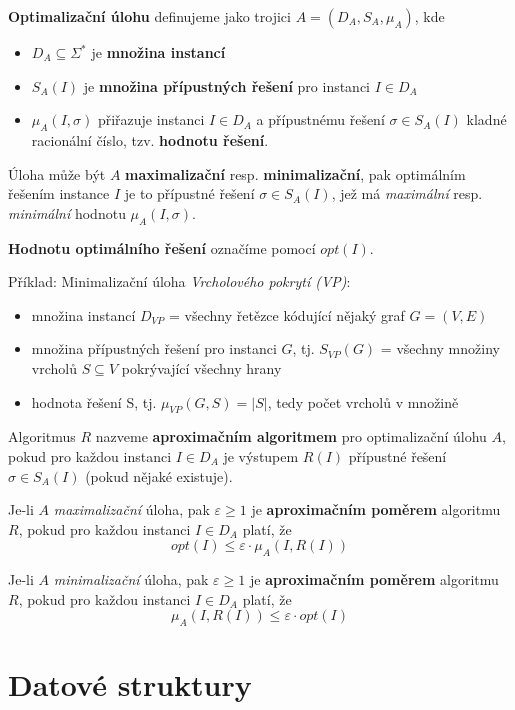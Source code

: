 \documentclass[11pt]{report} %
\begin{document}
\textbf{Optimalizační úlohu} definujeme jako trojici $A = (D_A, S_A, \mu_A)$, kde
\begin{itemize}
	\leftskip 20pt
	\setlength{\itemsep}{0pt}
	\item $D_A \subseteq \Sigma^*$ je \textbf{množina instancí}
	\item $S_A(I)$ je \textbf{množina přípustných řešení} pro instanci $I \in D_A$
	\item $\mu_A(I, \sigma)$ přiřazuje instanci $I \in D_A$ a přípustnému řešení  $\sigma \in S_A(I)$ kladné racionální číslo, tzv. \textbf{hodnotu řešení}.
\end{itemize}

Úloha může být $A$ \textbf{maximalizační} resp. \textbf{minimalizační}, pak optimálním řešením instance $I$ je to přípustné řešení $\sigma \in S_A(I)$, jež má \textit{maximální} resp. \textit{minimální} hodnotu $\mu_A(I, \sigma)$.

\textbf{Hodnotu optimálního řešení} označíme pomocí $opt(I)$.

Příklad: Minimalizační úloha \textit{Vrcholového pokrytí (VP)}: 
\begin{itemize}
	\leftskip 20pt
	\setlength{\itemsep}{0pt}
	\item množina instancí $D_{VP}$ = všechny řetězce kódující nějaký graf $G = (V,E)$	
	\item množina přípustných řešení pro instanci $G$, tj. $S_{VP}(G)$ = všechny množiny vrcholů $S \subseteq V$ pokrývající všechny hrany
	\item hodnota řešení S, tj. $\mu_{VP}(G,S) = |S|$, tedy počet vrcholů v množině
\end{itemize}


Algoritmus $R$ nazveme \textbf{aproximačním algoritmem} pro optimalizační úlohu $A$, pokud pro každou instanci $I \in D_A$ je výstupem $R(I)$ přípustné řešení $\sigma \in S_A(I)$ (pokud nějaké existuje).

Je-li $A$ \textit{maximalizační} úloha, pak $\varepsilon \geq 1$ je \textbf{aproximačním poměrem} algoritmu $R$, pokud pro každou instanci $I \in D_A$ platí, že 
$$opt(I) \leq \varepsilon \cdot \mu_A(I, R(I))$$

Je-li $A$ \textit{minimalizační} úloha, pak $\varepsilon \geq 1$ je \textbf{aproximačním poměrem} algoritmu $R$, pokud pro každou instanci $I \in D_A$ platí, že 
$$\mu_A(I, R(I)) \leq \varepsilon \cdot opt(I)$$



\chapter{Datové struktury}
\end{document}
